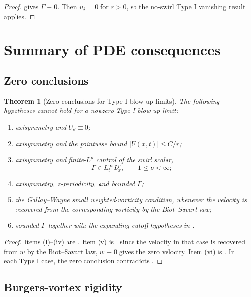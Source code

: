 \documentclass[11pt]{amsart}
\theoremstyle{plain}
\newtheorem{theorem}{Theorem}[section]
\theoremstyle{definition}
\theoremstyle{remark}
\numberwithin{equation}{section}
\begin{document}
\begin{proof}
 gives \(\Gamma\equiv0\).  Then
\(u_\theta=0\) for \(r>0\), so the no-swirl Type I vanishing result
 applies.
\end{proof}

\section{Summary of PDE consequences}
\label{sec:summary}

\subsection{Zero conclusions}

\begin{theorem}[Zero conclusions for Type I blow-up limits]
\label{thm:typeI-zero-hypotheses}
The following hypotheses cannot hold for a nonzero Type I blow-up limit:
\begin{enumerate}[label=\textup{(\roman*)}]
\item axisymmetry and \(U_\theta\equiv0\);
\item axisymmetry and the pointwise bound \(|U(x,t)|\le C/r\);
\item axisymmetry and finite-\(L^p\) control of the swirl scalar,
\[
   \Gamma\in L_t^\infty L_x^p,\qquad 1\le p<\infty;
\]
\item axisymmetry, \(z\)-periodicity, and bounded \(\Gamma\);
\item the Gallay--Wayne small weighted-vorticity condition, whenever the
velocity is recovered from the corresponding vorticity by the Biot--Savart law;
\item bounded \(\Gamma\) together with the expanding-cutoff hypotheses in
.
\end{enumerate}
\end{theorem}

\begin{proof}
Items (i)--(iv) are .  Item (v) is
; since the velocity in that
case is recovered from \(w\) by the Biot--Savart law, \(w\equiv0\) gives the
zero velocity.  Item (vi) is .  In each Type I case, the
zero conclusion contradicts .
\end{proof}

\subsection{Burgers-vortex rigidity}
\end{document}
